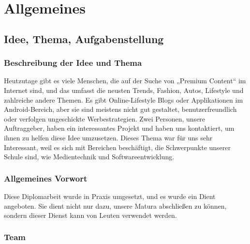 \chapter{Allgemeines}
\section{Idee, Thema, Aufgabenstellung}
\subsection{Beschreibung der Idee und Thema}
Heutzutage gibt es viele Menschen, die auf der Suche von „Premium Content“ im Internet sind, und das umfasst die neusten Trends, Fashion, Autos, Lifestyle und zahlreiche andere Themen. Es gibt Online-Lifestyle Blogs oder Applikationen im Android-Bereich, aber sie sind meistens nicht gut gestaltet, benutzerfreundlich oder verfolgen ungeschickte Werbestrategien. Zwei Personen, unsere Auftraggeber, haben ein interessantes Projekt und haben uns kontaktiert, um ihnen zu helfen diese Idee umzusetzen. Dieses Thema war für uns sehr Interessant, weil es sich mit Bereichen beschäftigt, die Schwerpunkte unserer Schule sind, wie Medientechnik und Softwareentwicklung. 
\subsection{Allgemeines Vorwort}
Diese Diplomarbeit wurde in Praxis umgesetzt, und es wurde ein Dient angeboten. Sie dient nicht nur dazu, unsere Matura abschließen zu können, sondern dieser Dienst kann von Leuten verwendet werden.

\newpage

\subsection{Team}

